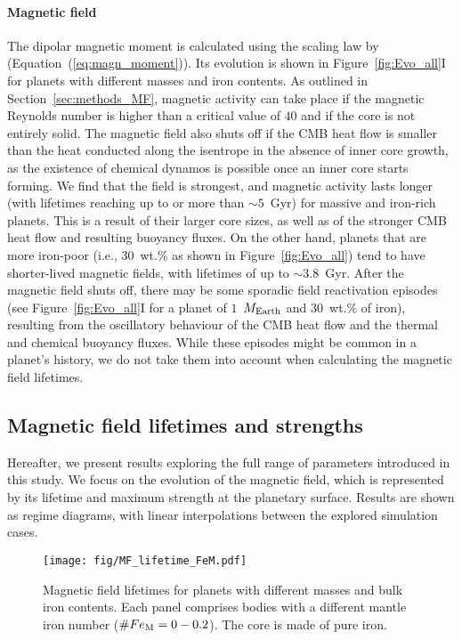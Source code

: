 \documentclass[draft]{agujournal2019} %
\begin{document}
\paragraph*{Magnetic field}

The dipolar magnetic moment is calculated using the scaling law by  (Equation~(\ref{eq:magn_moment})). Its evolution is shown in Figure~\ref{fig:Evo_all}I for planets with different masses and iron contents. As outlined in Section~\ref{sec:methods_MF}, magnetic activity can take place if the magnetic Reynolds number is higher than a critical value of $40$ and if the core is not entirely solid. The magnetic field also shuts off if the CMB heat flow is smaller than the heat conducted along the isentrope in the absence of inner core growth, as the existence of chemical dynamos is possible once an inner core starts forming. We find that the field is strongest, and magnetic activity lasts longer (with lifetimes reaching up to or more than $\sim 5$~Gyr) for massive and iron-rich planets. This is a result of their larger core sizes, as well as of the stronger CMB heat flow and resulting buoyancy fluxes. On the other hand, planets that are more iron-poor (i.e., 30~wt.\% as shown in Figure~\ref{fig:Evo_all}) tend to have shorter-lived magnetic fields, with lifetimes of up to $\sim 3.8$~Gyr. After the magnetic field shuts off, there may be some sporadic field reactivation episodes (see Figure~\ref{fig:Evo_all}I for a planet of $1$~$M_{\rm Earth}$ and $30$~wt.\% of iron), resulting from the oscillatory behaviour of the CMB heat flow and the thermal and chemical buoyancy fluxes. While these episodes might be common in a planet's history, we do not take them into account when calculating the magnetic field lifetimes.  

\subsection{Magnetic field lifetimes and strengths}\label{sec:general_trends}

Hereafter, we present results exploring the full range of parameters introduced in this study. We focus on the evolution of the magnetic field, which is represented by its lifetime and maximum strength at the planetary surface. Results are shown as regime diagrams, with linear interpolations between the explored simulation cases.  

\begin{figure}
\texttt{[image: fig/MF\_lifetime\_FeM.pdf]}
\caption{Magnetic field lifetimes for planets with different masses and bulk iron contents. Each panel comprises bodies with a different mantle iron number ($\#Fe_{\rm M}=0-0.2$). The core is made of pure iron.}
\label{fig:MF_lifetime}
\end{figure}
\end{document}
